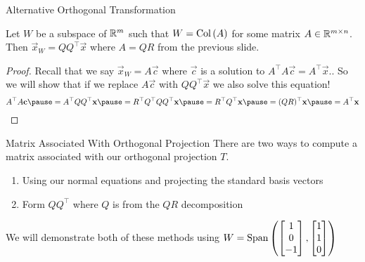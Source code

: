 \documentclass[xcoler=dvipsnames, aspectratio=169]{beamer}
\begin{document}
    \begin{frame}{Alternative Orthogonal Transformation}
        \begin{theorem}
            Let $W$ be a subspace of $\mathbb{R}^m$ such that $W=\mathrm{Col}\left(A\right)$ for some matrix $A\in\mathbb{R}^{m\times n}$.
            Then $\vec{x}_W=QQ^\top\vec{x}$ where $A = QR$ from the previous slide.
        \end{theorem}\pause
        \begin{proof}
            Recall that we say $\vec{x}_W = A\vec{c}$ where $\vec{c}$ is a solution to
            $A^\top A\vec{c} = A^\top\vec{x}$.\pause. So we will show that if we replace $A\vec{c}$ with
            $QQ^\top\vec{x}$ we also solve this equation!\pause
            \[
                A^\top A\vec{c}\pause = A^\top QQ^\top\vec{x}\pause = R^\top Q^\top QQ^\top\vec{x}\pause
                = R^\top Q^\top\vec{x}\pause = (QR)^\top\vec{x}\pause = A^\top\vec{x}
            \]
        \end{proof}
    \end{frame}
    \begin{frame}{Matrix Associated With Orthogonal Projection}
        There are two ways to compute a matrix associated with our orthogonal projection $T$.
        \begin{enumerate}
            \pause\item Using our normal equations and projecting the standard basis vectors
            \pause\item Form $QQ^\top$ where $Q$ is from the $QR$ decomposition
        \end{enumerate}\pause
        We will demonstrate both of these methods using $W=\text{Span}\left(\begin{bmatrix}1\\0\\-1\end{bmatrix}, \begin{bmatrix}1\\1\\0\end{bmatrix}\right)$
    \end{frame}
\end{document}

